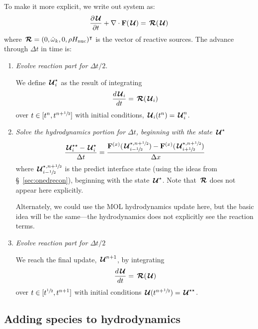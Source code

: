 To make it more explicit, we write out system as:
\begin{equation}
{\frac{{\partial{\,\boldsymbol{\mathcal{U}}}}}{\partial t}} + \nabla \cdot {\bf F}({\,\boldsymbol{\mathcal{U}}}) = {\,\boldsymbol{\mathcal{R}}}({\,\boldsymbol{\mathcal{U}}})
\end{equation}
where ${\,\boldsymbol{\mathcal{R}}} = (0, {\dot{\omega}}_k, 0, \rho {H_\mathrm{nuc}})^\intercal$ is the vector
of reactive sources.  The advance through $\Delta t$ in time is:
\begin{enumerate}
\item {\em Evolve reaction part for $\Delta t/2$}.

  We define ${\,\boldsymbol{\mathcal{U}}}_i^\star$ as the result of integrating
  \begin{equation}
    \frac{d{\,\boldsymbol{\mathcal{U}}}_i}{dt} = {\,\boldsymbol{\mathcal{R}}}({\,\boldsymbol{\mathcal{U}}}_i)
  \end{equation}
  over $t \in [t^n, t^{n+{\sfrac{1}{2}}}]$ with initial conditions, 
  ${\,\boldsymbol{\mathcal{U}}}_i(t^n) = {\,\boldsymbol{\mathcal{U}}}_i^n$.

\item {\em Solve the hydrodynamics portion for $\Delta t$, beginning
    with the state ${\,\boldsymbol{\mathcal{U}}}^\star$}
   \begin{equation}
     \frac{{\,\boldsymbol{\mathcal{U}}}^{\star\star}_i - {\,\boldsymbol{\mathcal{U}}}^\star_i}{\Delta t} =
      \frac{{\bf F}^{(x)}({\,\boldsymbol{\mathcal{U}}}^{\star,n+{\sfrac{1}{2}}}_{i-{\sfrac{1}{2}}}) - {\bf F}^{(x)}({\,\boldsymbol{\mathcal{U}}}^{\star,n+{\sfrac{1}{2}}}_{i+{\sfrac{1}{2}}})}{\Delta x}
   \end{equation}
  where ${\,\boldsymbol{\mathcal{U}}}^{\star,n+{\sfrac{1}{2}}}_{i-{\sfrac{1}{2}}}$ is the predict interface
  state (using the ideas from \S~\ref{sec:onedrecon}), beginning with
  the state ${\,\boldsymbol{\mathcal{U}}}^\star$.  Note that ${\,\boldsymbol{\mathcal{R}}}$ does not appear here
  explicitly.

  Alternately, we
  could use the MOL hydrodynamics update here, but the basic idea will
  be the same---the hydrodynamics does not explicitly see the reaction
  terms.

\item {\em Evolve reaction part for $\Delta t/2$}

  We reach the final update, ${\,\boldsymbol{\mathcal{U}}}^{n+1}$, by integrating
  \begin{equation}
    \frac{d{\,\boldsymbol{\mathcal{U}}}}{dt} = {\,\boldsymbol{\mathcal{R}}}({\,\boldsymbol{\mathcal{U}}})
  \end{equation}
  over $t \in [t^{{\sfrac{1}{2}}}, t^{n+1}]$ with initial conditions
    ${\,\boldsymbol{\mathcal{U}}}(t^{n+{\sfrac{1}{2}}}) = {\,\boldsymbol{\mathcal{U}}}^{\star\star}$.

\end{enumerate}



\subsection{Adding species to hydrodynamics}

